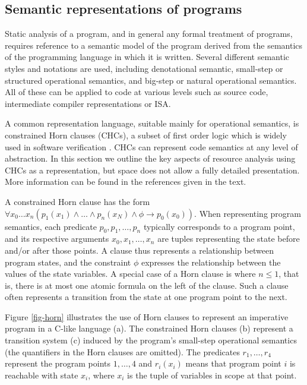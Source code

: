 \subsection{Semantic representations of programs}
Static analysis of a program, and in general any formal treatment of programs, requires reference 
to a semantic model of the program derived from the semantics of the
programming language in which it is written. Several different semantic styles
and notations are used, including denotational semantic, small-step or structured
operational semantics, and big-step or natural operational semantics.
All of these can be applied to code
 at various levels such as source code, intermediate compiler
representations or ISA.

A common representation language, suitable mainly for operational semantics, is
constrained Horn clauses (CHCs), a subset of first order logic which is
widely used in software verification
\cite{DBLP:conf/birthday/BjornerGMR15}. CHCs can represent code semantics at any
level of abstraction. In this section we outline the key aspects of
resource analysis using CHCs as a representation, but space does not
allow a fully detailed presentation.  More information can be found in the
references given in the text.

A constrained Horn clause has the form $\forall x_0 \ldots x_n 
(p_1(x_1) \wedge \ldots \wedge p_n(x_N) \wedge \phi \rightarrow
p_0(x_0))$. When representing program semantics, each predicate
$p_0,p_1,\ldots,p_n$ typically corresponds to a program point, and its
respective arguments $x_0,x_1,\ldots,x_n$ are tuples representing the
state before and/or after those points.  A clause thus represents a
relationship between program states, and the constraint $\phi$ expresses
the relationship between the values of the state variables. A special case
of a Horn clause is where $n \le 1$, that is, there is at most one atomic
formula on the left of the clause.  Such a clause often represents a transition 
from the state at one program point to the next.

Figure \ref{fig-horn} illustrates the use of Horn clauses to 
represent an imperative program in a C-like language (a).
The constrained Horn clauses (b) represent a transition
system (c) induced by the program's small-step operational 
semantics (the quantifiers in
the Horn clauses are
omitted).  The predicates
$r_1, \ldots, r_4$ represent the program points $1,\ldots,4$ and
$r_i(x_i)$ means that program point $i$  is reachable with state
$x_i$, where $x_i$ is the tuple of variables in scope at that point.

